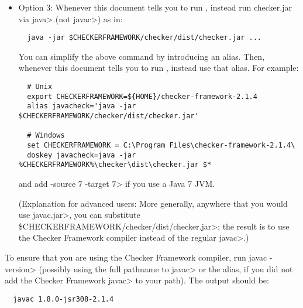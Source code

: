 \begin{itemize}
   \item
   Option 3:
   Whenever this document tells you to run , instead
   run checker.jar via \<java> (not \<javac>) as in:

\begin{Verbatim}
  java -jar $CHECKERFRAMEWORK/checker/dist/checker.jar ...
\end{Verbatim}

    You can simplify the above command by introducing an alias.  Then,
    whenever this document tells you to run , instead use that
    alias.  For example:

\begin{Verbatim}
  # Unix
  export CHECKERFRAMEWORK=${HOME}/checker-framework-2.1.4
  alias javacheck='java -jar $CHECKERFRAMEWORK/checker/dist/checker.jar'

  # Windows
  set CHECKERFRAMEWORK = C:\Program Files\checker-framework-2.1.4\
  doskey javacheck=java -jar %CHECKERFRAMEWORK%\checker\dist\checker.jar $*
\end{Verbatim}

   \noindent
   and add \<-source 7 -target 7> if you use a Java 7 JVM.

   (Explanation for advanced users:  More generally, anywhere that you would use \<javac.jar>, you can substitute
   \<\$CHECKERFRAMEWORK/checker/dist/checker.jar>;
   the result is to use the Checker
   Framework compiler instead of the regular \<javac>.)

\end{itemize}


To ensure that you are using the Checker Framework compiler, run
\<javac -version> (possibly using the
full pathname to \<javac> or the alias, if you did not add the Checker
Framework \<javac> to your path).
The output should be:

\begin{Verbatim}
  javac 1.8.0-jsr308-2.1.4
\end{Verbatim}




